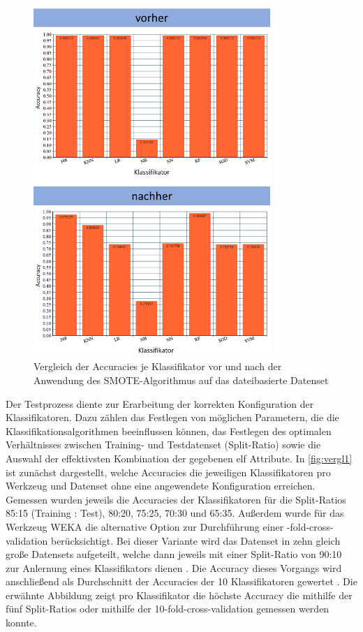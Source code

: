 \begin{figure}[]
    \centering
    \includegraphics[width=0.8\textwidth]{images/smoted}
    \caption{Vergleich der Accuracies je Klassifikator vor und nach der Anwendung des SMOTE-Algorithmus auf das dateibasierte Datenset\label{fig:smoted}}
\end{figure}

Der Testprozess diente zur Erarbeitung der korrekten Konfiguration der Klassifikatoren. Dazu zählen das Festlegen von möglichen Parametern, die die Klassifikationsalgorithmen beeinflussen können, das Festlegen des optimalen Verhältnisses zwischen Training- und Testdatenset (Split-Ratio) sowie die Auswahl der effektivsten Kombination der gegebenen elf Attribute. In \autoref{fig:vergl1} ist zunächst dargestellt, welche Accuracies die jeweiligen Klassifikatoren pro Werkzeug und Datenset ohne eine angewendete Konfiguration erreichen. Gemessen wurden jeweils die Accuracies der Klassifikatoren für die Split-Ratios 85:15 (Training : Test), 80:20, 75:25, 70:30 und 65:35. Außerdem wurde für das Werkzeug WEKA die alternative Option zur Durchführung einer -fold-cross-validation\grqq{} berücksichtigt. Bei dieser Variante wird das Datenset in zehn gleich große Datensets aufgeteilt, welche dann jeweils mit einer Split-Ratio von 90:10 zur Anlernung eines Klassifikators dienen \cite{IanWitten}. Die Accuracy dieses Vorgangs wird anschließend als Durchschnitt der Accuracies der 10 Klassifikatoren gewertet \cite{IanWitten}. Die erwähnte Abbildung zeigt pro Klassifikator die höchste Accuracy die mithilfe der fünf Split-Ratios oder mithilfe der 10-fold-cross-validation gemessen werden konnte. 

